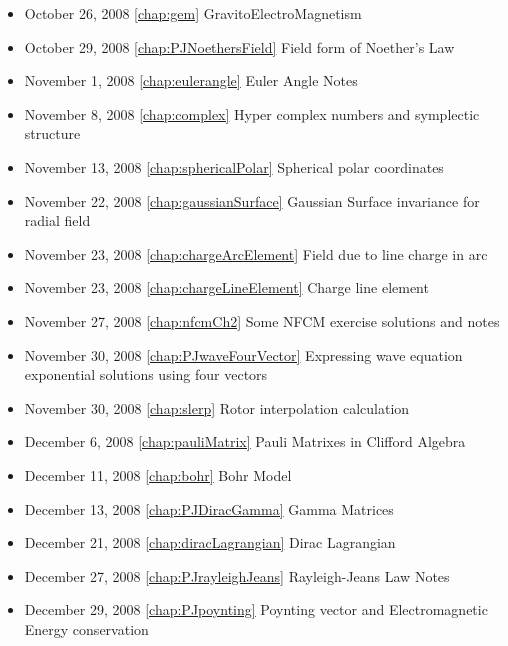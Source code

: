 \begin{itemize}
\item October 26, 2008 \ref{chap:gem} GravitoElectroMagnetism

\item October 29, 2008 \ref{chap:PJNoethersField} Field form of Noether's Law

\item November 1, 2008 \ref{chap:eulerangle} Euler Angle Notes

\item November 8, 2008 \ref{chap:complex} Hyper complex numbers and symplectic structure

\item November 13, 2008 \ref{chap:sphericalPolar} Spherical polar coordinates

\item November 22, 2008 \ref{chap:gaussianSurface} Gaussian Surface invariance for radial field

\item November 23, 2008 \ref{chap:chargeArcElement} Field due to line charge in arc

\item November 23, 2008 \ref{chap:chargeLineElement} Charge line element

\item November 27, 2008 \ref{chap:nfcmCh2} Some NFCM exercise solutions and notes

\item November 30, 2008 \ref{chap:PJwaveFourVector} Expressing wave equation exponential solutions using four vectors

\item November 30, 2008 \ref{chap:slerp} Rotor interpolation calculation

\item December 6, 2008 \ref{chap:pauliMatrix} Pauli Matrixes in Clifford Algebra

\item December 11, 2008 \ref{chap:bohr} Bohr Model

\item December 13, 2008 \ref{chap:PJDiracGamma} Gamma Matrices

\item December 21, 2008 \ref{chap:diracLagrangian} Dirac Lagrangian

\item December 27, 2008 \ref{chap:PJrayleighJeans} Rayleigh-Jeans Law Notes

\item December 29, 2008 \ref{chap:PJpoynting} Poynting vector and Electromagnetic Energy conservation


\end{itemize}
